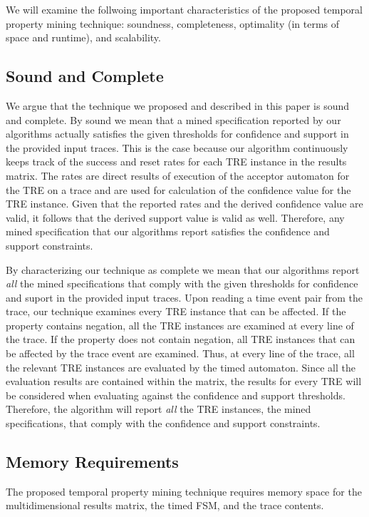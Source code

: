 \documentclass[]{sigplanconf}
\begin{document}
We will examine the follwoing important characteristics of the proposed temporal property mining technique: soundness, completeness, optimality (in terms of space and runtime), and scalability.


\subsection{Sound and Complete}

We argue that the technique we proposed and described in this paper is sound and complete. By sound we mean that a mined specification reported by our algorithms actually satisfies the given thresholds for confidence and support in the provided input traces. This is the case because our algorithm continuously keeps track of the success and reset rates for each TRE instance in the results matrix. The rates are direct results of execution of the acceptor automaton for the TRE on a trace and are used for calculation of the confidence value for the TRE instance. Given that the reported rates and the derived confidence value are valid, it follows that the derived support value is valid as well. Therefore, any mined specification that our algorithms report satisfies the confidence and support constraints.

By characterizing our technique as complete we mean that our algorithms report \emph{all} the mined specifications that comply with the given thresholds for confidence and suport in the provided input traces. Upon reading a time event pair from the trace, our technique examines every TRE instance that can be affected. If the property contains negation, all the TRE instances are examined at every line of the trace. If the property does not contain negation, all TRE instances that can be affected by the trace event are examined. Thus, at every line of the trace, all the relevant TRE instances are evaluated by the timed automaton. Since all the evaluation results are contained within the matrix, the results for every TRE will be considered when evaluating against the confidence and support thresholds. Therefore, the algorithm will report \emph{all} the TRE instances, the mined specifications, that comply with the confidence and support constraints.


\subsection{Memory Requirements}

The proposed temporal property mining technique requires memory space for the multidimensional results matrix, the timed FSM, and the trace contents.
\end{document}
